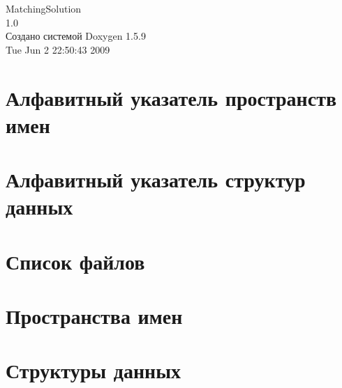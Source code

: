 \documentclass[a4paper]{book}
\begin{document}
\hypersetup{pageanchor=false}
\begin{titlepage}
\vspace*{7cm}
\begin{center}
{\Large MatchingSolution \\[1ex]\large 1.0 }\\
\vspace*{1cm}
{\large Создано системой Doxygen 1.5.9}\\
\vspace*{0.5cm}
{\small Tue Jun 2 22:50:43 2009}\\
\end{center}
\end{titlepage}
\clearemptydoublepage
{}
\tableofcontents
\clearemptydoublepage
{}
\hypersetup{pageanchor=true}
\chapter{Алфавитный указатель пространств имен}

\chapter{Алфавитный указатель структур данных}

\chapter{Список файлов}

\chapter{Пространства имен}




\chapter{Структуры данных}























\end{document}
